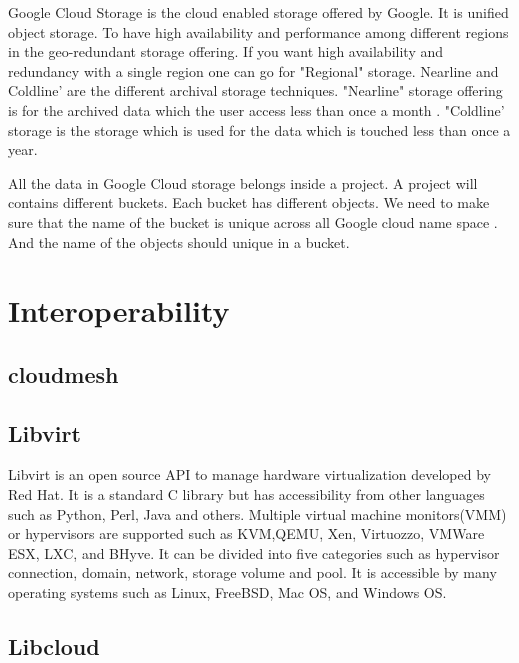      Google Cloud Storage is the cloud enabled storage offered by
     Google. \cite{www-google-cloud-storage} It is unified object
     storage. To have high availability and performance among
     different regions in the geo-redundant storage offering. If you
     want high availability and redundancy with a single region one
     can go for "Regional" storage. Nearline and Coldline’ are the
     different archival storage techniques. "Nearline" storage
     offering is for the archived data which the user access less than
     once a month . "Coldline’ storage is the storage which is used
     for the data which is touched less than once a year.

     All the data in Google Cloud storage belongs inside a project. A
     project will contains different buckets. Each bucket has
     different objects. We need to make sure that the name of the
     bucket is unique across all Google cloud name space . And the
     name of the objects should unique in a bucket.


\section{Interoperability}


\subsection{cloudmesh}

\subsection{ Libvirt}

     Libvirt is an open source API to manage hardware virtualization
     developed by Red Hat.  It is a standard C library but has
     accessibility from other languages such as Python, Perl, Java and
     others. \cite{www-libvirt} Multiple virtual machine
     monitors(VMM) or hypervisors are supported such as KVM,QEMU, Xen,
     Virtuozzo, VMWare ESX, LXC, and BHyve.  It can be divided into
     five categories such as hypervisor connection, domain, network,
     storage volume and pool.  \cite{www-ibm} It is accessible by
     many operating systems such as Linux, FreeBSD, Mac OS, and
     Windows OS.
     
\subsection{ Libcloud}


